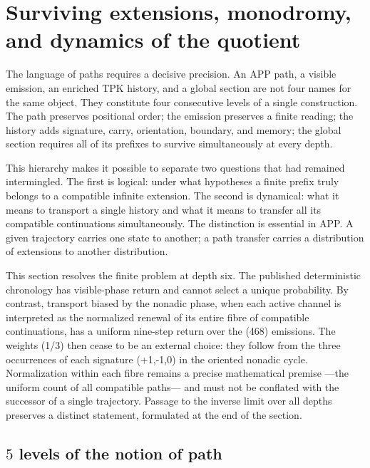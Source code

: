 \chapter{Surviving extensions, monodromy, and dynamics of the quotient}
\label{chap:extensiones-dinamica-cociente}

The language of paths requires a decisive precision. An APP path,
a visible emission, an enriched TPK history, and a global section
are not four names for the same object. They constitute four consecutive levels
of a single construction. The path preserves positional order;
the emission preserves a finite reading; the history adds signature,
carry, orientation, boundary, and memory; the global section requires all
of its prefixes to survive simultaneously at every depth.

This hierarchy makes it possible to separate two questions that had remained intermingled. The first is logical: under what hypotheses a finite prefix truly belongs to a compatible infinite extension. The second is dynamical: what it means to transport a single history and what it means to transfer all its compatible continuations simultaneously. The distinction is essential in APP\@. A given trajectory carries one state to another; a path transfer carries a distribution of extensions to another distribution.

This section resolves the finite problem at depth six. The
published deterministic chronology has visible-phase return and cannot select
a unique probability. By contrast, transport biased by the nonadic phase,
when each active channel is interpreted as the normalized renewal of its entire
fibre of compatible continuations, has a uniform nine-step return
over the (468) emissions. The weights (1/3) then cease to be
an external choice: they follow from the three occurrences of each signature
(+1,-1,0) in the oriented nonadic cycle. Normalization within each fibre remains
a precise mathematical premise ---the uniform count of all compatible
paths--- and must not be conflated with the successor of a single
trajectory. Passage to the inverse limit over all depths preserves a
distinct statement, formulated at the end of the section.

\section{\(5\) levels of the notion of path}

